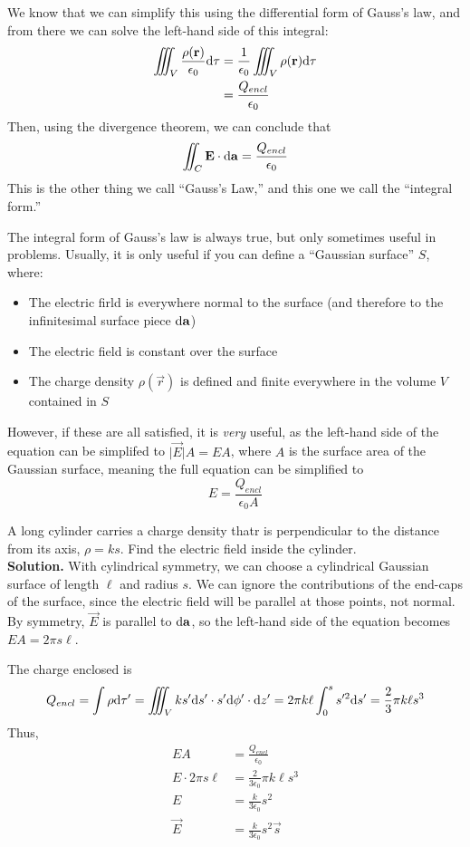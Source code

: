 \documentclass[a4paper]{article}
\begin{document}
We know that we can simplify this using the differential form of Gauss's
law, and from there we can solve the left-hand side of this integral:
\begin{align*}
	\iiint_V \frac{\rho(\boldsymbol{\mathbf{r}})}{\epsilon_0}\mathrm{d}\tau &=
	\frac{1}{\epsilon_0}\iiint_V\rho(\boldsymbol{\mathbf{r}})\mathrm{d}\tau\\
	&= \frac{Q_{encl}}{\epsilon_0}
\end{align*}
Then, using the divergence theorem, we can conclude that
\[
	\iint_C \boldsymbol{\mathbf{E}}\cdot\mathrm{d}\boldsymbol{\mathbf{a}} = \frac{Q_{encl}}{\epsilon_0}
\]
This is the other thing we call ``Gauss's Law,'' and this one we call
the ``integral form.''

The integral form of Gauss's law is always true, but only sometimes useful in
problems. Usually, it is only useful if you can define a ``Gaussian surface''
$S$, where:
\begin{itemize}
	\item The electric firld is everywhere normal to the surface (and
	therefore to the infinitesimal surface piece $\mathrm{d}\boldsymbol{\mathbf{a}}$)
	\item The electric field is constant over the surface
	\item The charge density $\rho(\vec{r})$ is defined and finite
	everywhere in the volume $V$ contained in $S$
\end{itemize}
However, if these are all satisfied, it is \emph{very} useful, as the
left-hand side of the equation can be simplifed to
$\lvert\vec{E}\rvert A = EA$, where $A$ is the surface area of the
Gaussian surface, meaning the full equation can be simplified to
\[ E = \frac{Q_{encl}}{\epsilon_0 A} \]

\begin{eg}
A long cylinder carries a charge density thatr is perpendicular to the distance
from its axis, $\rho = ks$. Find the electric field inside the cylinder.\\
\textbf{Solution.}
With cylindrical symmetry, we can choose a cylindrical Gaussian surface of
length $\ell$ and radius $s$. We can ignore the contributions of the end-caps
of the surface, since the electric field will be parallel at those points, not
normal. By symmetry, $\vec{E}$ is parallel to $\mathrm{d}\boldsymbol{\mathbf{a}}$, so the left-hand
side of the equation becomes $EA = 2\pi s\ell$.

The charge enclosed is
\[
Q_{encl} = \int\rho\mathrm{d}\tau'=\iiint_Vks'\mathrm{d} s'\cdot s'\mathrm{d}\phi'\cdot\mathrm{d} z'
	= 2\pi k\ell\int_0^s s'^2\mathrm{d} s' = \frac{2}{3}\pi k\ell s^3
\]
Thus,
\begin{align*}
	EA &= \frac{Q_{encl}}{\epsilon_0}\\
	E\cdot 2\pi s\ell &= \frac{2}{3\epsilon_0}\pi k\ell s^3\\
	E &= \frac{k}{3\epsilon_0}s^2\\
	\vec{E} &= \frac{k}{3\epsilon_0}s^2\hat{\vec{s}}\\
\end{align*}
\end{eg}
\end{document}
